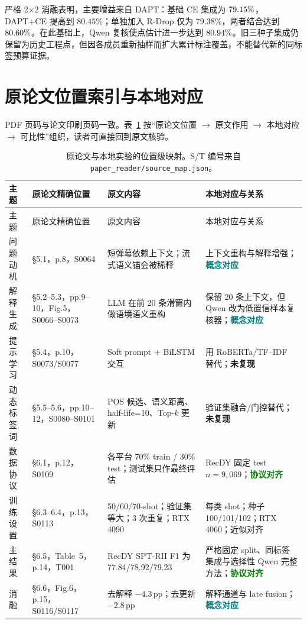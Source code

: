 \documentclass[UTF8,zihao=-4,a4paper]{ctexart}
\newcommand{\pp}{\,pp}
\newcommand{\direct}{\textcolor{Green}{\textbf{协议对齐}}}
\newcommand{\concept}{\textcolor{Teal}{\textbf{概念对应}}}
\newcommand{\notreproduced}{\textcolor{Rose}{\textbf{未复现}}}
\begin{document}
严格 2$\times$2 消融表明，主要增益来自 DAPT：基础 CE 集成为 $79.15\%$，DAPT+CE 提高到 $80.45\%$；单独加入 R-Drop 仅为 $79.38\%$，两者结合达到 $80.60\%$。在此基础上，Qwen 复核使点估计进一步达到 $80.94\%$。旧三种子集成仍保留为历史工程点，但因各成员重新抽样而扩大累计标注覆盖，不能替代新的同标签预算证据。

\clearpage
\section{原论文位置索引与本地对应}

PDF 页码与论文印刷页码一致。表~\ref{tab:location-map} 按“原论文位置 $\rightarrow$ 原文作用 $\rightarrow$ 本地对应 $\rightarrow$ 可比性”组织，读者可直接回到原文核验。

\small
\begin{longtable}{p{1.7cm}p{3.35cm}p{5.2cm}p{5.25cm}}
\caption{原论文与本地实验的位置级映射。S/T 编号来自 \texttt{paper\_reader/source\_map.json}。}\label{tab:location-map}\\
\toprule
主题 & 原论文精确位置 & 原文内容 & 本地对应与关系 \\
\midrule
\endfirsthead
\toprule
主题 & 原论文精确位置 & 原文内容 & 本地对应与关系 \\
\midrule
\endhead
问题动机 & \S5.1，p.8，S0064 & 短弹幕依赖上下文；流式语义锚会被稀释 & 上下文重构与解释增强；\concept \\
解释生成 & \S5.2--5.3，pp.9--10，Fig.5，S0066--S0073 & LLM 在前 20 条滑窗内做语境语义重构 & 保留 20 条上下文，但 Qwen 改为低置信样本复核器；\concept \\
提示学习 & \S5.4，p.10，S0073/S0077 & Soft prompt + BiLSTM 交互 & 用 RoBERTa/TF--IDF 替代；\notreproduced \\
动态标签词 & \S5.5--5.6，pp.10--12，S0080--S0101 & POS 候选、语义距离、half-life=10、Top-$k$ 更新 & 验证集融合/门控替代；\notreproduced \\
数据协议 & \S6.1，p.12，S0109 & 各平台 70\% train / 30\% test；测试集只作最终评估 & RecDY 固定 test $n=9{,}069$；\direct \\
训练设置 & \S6.3--6.4，p.13，S0113 & 50/60/70-shot；验证集等大；3 次重复；RTX 4090 & 每类 shot；种子 100/101/102；RTX 4060；近似对齐 \\
主结果 & \S6.5，Table~5，p.14，T001 & RecDY SPT-RII F1 为 77.84/78.92/79.23 & 严格固定 split、同标签集成与选择性 Qwen 完整方法；\direct \\
消融 & \S6.6，Fig.6，p.15，S0116/S0117 & 去解释 $-4.3$\pp；去更新 $-2.8$\pp & 解释通道与 late fusion；\concept \\

\end{longtable}
\end{document}
